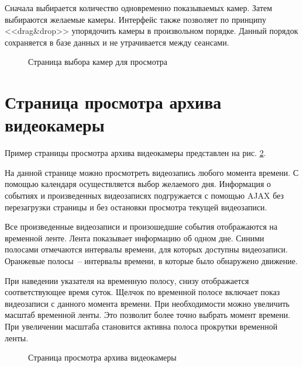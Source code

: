 Сначала выбирается количество одновременно показываемых камер.
Затем выбираются желаемые камеры.
Интерфейс также позволяет по принципу <<drag\&drop>> упорядочить камеры в
произвольном порядке. Данный порядок сохраняется в базе данных и не
утрачивается между сеансами.

\begin{figure}[!htb]
\def\svgwidth{\columnwidth}
\caption{Страница выбора камер для просмотра}
\label{ui_2}
\end{figure}

\section{Страница просмотра архива видеокамеры}
Пример страницы просмотра архива видеокамеры представлен на рис. \ref{ui_3}.

На данной странице можно просмотреть видеозапись любого момента времени.
С помощью календаря осуществляется выбор желаемого дня. Информация о событиях и произведенных
видеозаписях подгружается с помощью AJAX без перезагрузки страницы и без остановки просмотра
текущей видеозаписи.

Все произведенные видеозаписи и произошедшие события отображаются на временной ленте.
Лента показывает информацию об одном дне. Синими полосами отмечаются интервалы времени,
для которых доступны видеозаписи. Оранжевые полосы~-- интервалы времени, в которые было обнаружено
движение.

При наведении указателя на временную полосу, снизу отображается соответствующее время суток.
Щелчок по временной полосе включает показ видеозаписи с данного момента времени.
При необходимости можно увеличить масштаб временной ленты.
Это позволит более точно выбрать момент времени.
При увеличении масштаба становится активна полоса прокрутки временной ленты.

\begin{figure}[!htb]
\def\svgwidth{\columnwidth}
\caption{Страница просмотра архива видеокамеры}
\label{ui_3}
\end{figure}
